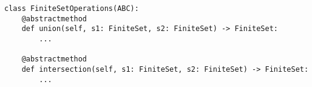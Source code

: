 \par\begin{minipage}{70ex}
\begin{verbatim}
class FiniteSetOperations(ABC):
    @abstractmethod
    def union(self, s1: FiniteSet, s2: FiniteSet) -> FiniteSet:
        ...

    @abstractmethod
    def intersection(self, s1: FiniteSet, s2: FiniteSet) -> FiniteSet:
        ...
\end{verbatim}
\end{minipage}\par